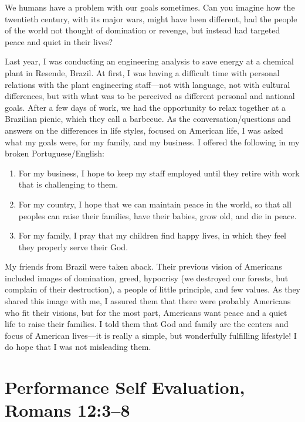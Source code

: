 \documentclass[12pt]{memoir}
\begin{document}
We humans have a problem with our goals sometimes. Can you imagine
how the twentieth century, with its major wars, might have been different,
had the people of the world not thought of domination or revenge,
but instead had targeted peace and quiet in their lives?

Last year, I was conducting an engineering analysis to save energy
at a chemical plant in Resende, Brazil. At first, I was having a difficult
time with personal relations with the plant engineering staff---not
with language, not with cultural differences, but with what was to
be perceived as different personal and national goals. After a few
days of work, we had the opportunity to relax together at a Brazilian
picnic, which they call a barbecue. As the conversation\slash{}questions
and answers on the differences in life styles, focused on American
life, I was asked what my goals were, for my family, and my business. I offered the following in my broken Portuguese\slash{}English:

\begin{enumerate}
\item For my business, I hope to keep my staff employed until they retire with work that is challenging to them. 

\item For my country, I hope that we can maintain peace in the world, so that all peoples can raise their families, have their babies, grow old, and die in peace. 

\item For my family, I pray that my children find happy lives, in which they feel they properly serve their God. 
\end{enumerate}

My friends from Brazil were taken aback. Their previous vision of
Americans included images of domination, greed, hypocrisy (we destroyed
our forests, but complain of their destruction), a people of little
principle, and few values. As they shared this image with me, I assured
them that there were probably Americans who fit their visions, but
for the most part, Americans want peace and a quiet life to raise
their families. I told them that God and family are the centers and focus of American lives---it is really a simple, but wonderfully fulfilling lifestyle!
I do hope that I was not misleading them.

\section[Performance Self Evaluation]{Performance Self Evaluation, Romans 12:3--8}
\end{document}
